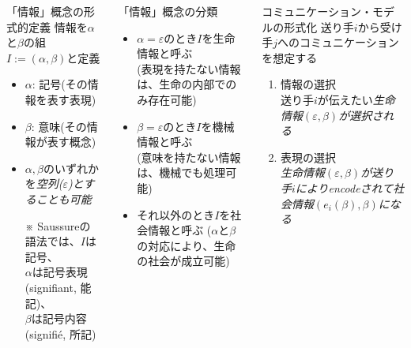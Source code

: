 \begin{columns}[onlytextwidth,t]
\begin{column}{.24\hsize}
\begin{block}{「情報」概念の形式的定義}
\alert{情報}を$\alpha$と$\beta$の組$I := (\alpha, \beta)$と定義
\begin{itemize}
	\item $\alpha$: \alert{記号}(その情報を表す表現)
	\item $\beta $: \alert{意味}(その情報が表す概念)
	\item $\alpha, \beta$のいずれかを\em{空列}($\varepsilon$)とすることも可能
	\item[※] Saussureの語法では、$I$は記号、 \\
		$\alpha$は記号表現(signifiant, 能記)、 \\
		$\beta$は記号内容(signifié, 所記)\cite{saussure}
\end{itemize}
\end{block}
\end{column}
\begin{column}{.24\hsize}
\begin{block}{「情報」概念の分類}
\begin{itemize}
	\item $\alpha = \varepsilon$のとき$I$を\alert{生命情報}と呼ぶ \\ (表現を持たない情報は、生命の内部でのみ存在可能)
	\item $\beta  = \varepsilon$のとき$I$を\alert{機械情報}と呼ぶ \\ (意味を持たない情報は、機械でも処理可能)
	\item それ以外のとき$I$を\alert{社会情報}と呼ぶ ($\alpha$と$\beta$の対応により、生命の社会が成立可能)
\end{itemize}
\end{block}
\end{column}
\begin{column}{.47\hsize}
\begin{block}{コミュニケーション・モデルの形式化}
送り手$i$から受け手$j$へのコミュニケーションを想定する\cite{luhmann}\cite{borch}\cite{ohnishi}
\begin{enumerate}
	\item \alert{情報の選択} \\
		送り手$i$が伝えたい\em{生命情報}$(\varepsilon, \beta)$が選択される
	\item \alert{表現の選択} \\
		\em{生命情報}$(\varepsilon, \beta)$が送り手$i$によりencodeされて\em{社会情報}$(e_i(\beta), \beta)$になる

\end{enumerate}
\end{block}
\end{column}
\end{columns}
